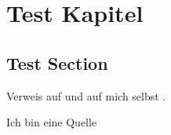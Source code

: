 \documentclass[
    load-dhbw-templates,
    add-bibliography,
    bib-file = quellen.bib,
    ngerman,
    debug
]{iodhbwm}
\begin{document}
    
    \dhbwtitlepage
    
    \dhbwdeclaration
    
    \tableofcontents
    \listoffigures
    \listoftables
    
    \chapter{Test Kapitel}\label{chap:test-chap}
        \section{Test Section}\label{sec:test-sec}
            \blindtext
            
            Verweis auf  und auf mich selbst .
            
            \lipsum
            
            Ich bin eine Quelle \cite{Helmke2007}
\end{document}
